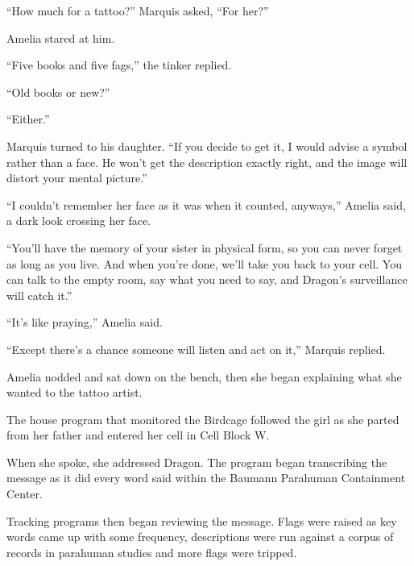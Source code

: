 ``How much for a tattoo?'' Marquis asked, ``For her?''



Amelia stared at him.



``Five books and five fags,'' the tinker replied.



``Old books or new?''



``Either.''



Marquis turned to his daughter.  ``If you decide to get it, I would advise a symbol rather than a face.  He won't get the description exactly right, and the image will distort your mental picture.''



``I couldn't remember her face as it was when it counted, anyways,'' Amelia said, a dark look crossing her face.



``You'll have the memory of your sister in physical form, so you can never forget as long as you live.  And when you're done, we'll take you back to your cell.  You can talk to the empty room, say what you need to say, and Dragon's surveillance will catch it.''



``It's like praying,'' Amelia said.



``Except there's a chance someone will listen and act on it,'' Marquis replied.



Amelia nodded and sat down on the bench, then she began explaining what she wanted to the tattoo artist.



\blacksquare



The house program that monitored the Birdcage followed the girl as she parted from her father and entered her cell in Cell Block W.



When she spoke, she addressed Dragon.  The program began transcribing the message as it did every word said within the Baumann Parahuman Containment Center.



Tracking programs then began reviewing the message.  Flags were raised as key words came up with some frequency, descriptions were run against a corpus of records in parahuman studies and more flags were tripped.



